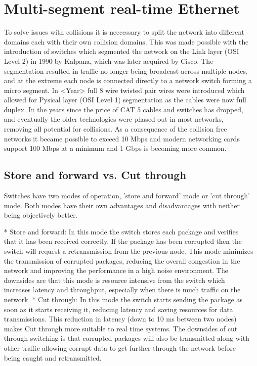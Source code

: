 \section{Multi-segment real-time Ethernet}


To solve issues with collisions it is neccessary to split the network into different domains each with their own collision domains. This was made possible with the introduction of switches which segmented the network on the Link layer (OSI Level 2) in 1990 by Kalpana, which was later acquired by Cisco. The segmentation resulted in traffic no longer being broadcast across multiple nodes, and at the extreme each node is connected directly to a network switch forming a micro segment. In <Year> full 8 wire twisted pair wires were introduced which allowed for Pysical layer (OSI Level 1) segmentation as the cables were now full duplex. In the years since the price of CAT 5 cables and switches has dropped, and eventually the older technologies were phased out in most networks, removing all potential for collisions. As a consequence of the collision free networks it became possible to exceed 10 Mbps and modern networking cards support 100 Mbps at a minimum and 1 Gbps is becoming more common.

\subsection{Store and forward vs. Cut through}

Switches have two modes of operation, 'store and forward' mode or 'cut through' mode. Both modes have their own advantages and disadvantages with neither being objectively better. 

* Store and forward: In this mode the switch stores each package and verifies that it has been received correctly. If the package has been corrupted then the switch will request a retransmission from the previous node. This mode minimizes the transmission of corrupted packages, reducing the overall congestion in the network and improving the performance in a high noise environment. The downsides are that this mode is resource intensive from the switch which increases latency and throughput, especially when there is much traffic on the network.
* Cut through: In this mode the switch starts sending the package as soon as it starts receiving it, reducing latency and saving resources for data transmissions. This reduction in latency (down to 10 ms between two nodes) makes Cut through more suitable to real time systems. The downsides of cut through switching is that corrupted packages will also be transmitted along with other traffic allowing corrupt data to get further through the network before being caught and retransmitted. 

